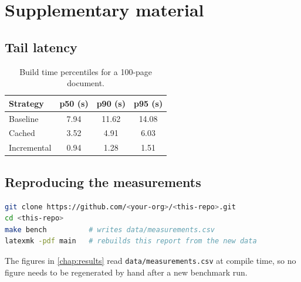 \chapter{Supplementary material}
\label{chap:appendix-a}

\section{Tail latency}

\begin{table}[htbp]
  \centering
  \caption{Build time percentiles for a \num{100}-page document.}
  \label{tab:percentiles}
  \small
  \begin{tabular}{@{}l S[table-format=2.2] S[table-format=2.2] S[table-format=2.2]@{}}
    \toprule
    \textbf{\sffamily Strategy} & {p50 (s)} & {p90 (s)} & {p95 (s)} \\
    \midrule
    Baseline    & 7.94 & 11.62 & 14.08 \\
    Cached      & 3.52 &  4.91 &  6.03 \\
    Incremental & 0.94 &  1.28 &  1.51 \\
    \bottomrule
  \end{tabular}
\end{table}

\section{Reproducing the measurements}

\begin{lstlisting}[language=bash,caption={Full reproduction sequence.},label={lst:repro}]
git clone https://github.com/<your-org>/<this-repo>.git
cd <this-repo>
make bench          # writes data/measurements.csv
latexmk -pdf main   # rebuilds this report from the new data
\end{lstlisting}

\begin{remark}
The figures in \cref{chap:results} read \texttt{data/measurements.csv}
at compile time, so no figure needs to be regenerated by hand after a
new benchmark run.
\end{remark}
